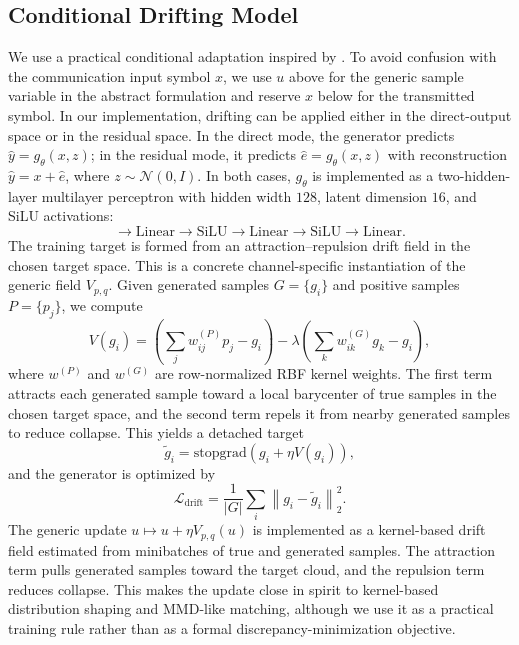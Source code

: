 \documentclass[conference]{IEEEtran}
\begin{document}
\subsection{Conditional Drifting Model}
  We use a practical conditional adaptation inspired by \cite{drifting}.
  To avoid confusion with the communication input symbol \(x\), we use \(u\) above for the generic
  sample variable in the abstract formulation and reserve \(x\) below for the transmitted symbol.
  In our implementation, drifting can be applied either in the direct-output space or in the residual space.
  In the direct mode, the generator predicts \(\hat y = g_\theta(x,z)\); in the residual mode, it predicts
  \(\hat e = g_\theta(x,z)\) with reconstruction \(\hat y = x + \hat e\), where \(z \sim \mathcal{N}(0, I).\)
  In both cases, \(g_\theta\) is implemented as a two-hidden-layer multilayer perceptron with hidden
  width \(128\), latent dimension \(16\), and SiLU activations:
\begin{equation}
[x, z]
\rightarrow
\mathrm{Linear}
\rightarrow
\mathrm{SiLU}
\rightarrow
\mathrm{Linear}
\rightarrow
\mathrm{SiLU}
\rightarrow
\mathrm{Linear}.
\end{equation}
The training target is formed from an attraction--repulsion drift field in the chosen target space. This is a concrete channel-specific instantiation of the generic field \(V_{p,q}\).
Given generated samples \(G = \{g_i\}\) and positive samples \(P = \{p_j\}\), we compute
\begin{equation}
V(g_i)
=
\left(
\sum_j w^{(P)}_{ij} p_j - g_i
\right)
-
\lambda
\left(
\sum_k w^{(G)}_{ik} g_k - g_i
\right),
\end{equation}
where \(w^{(P)}\) and \(w^{(G)}\) are row-normalized RBF kernel weights.
The first term attracts each generated sample toward a local barycenter of true samples in the chosen target space, and the second term repels it from nearby generated samples to reduce collapse.
This yields a detached target
\begin{equation}
\tilde{g}_i
=
\mathrm{stopgrad}\!\left(g_i + \eta V(g_i)\right),
\end{equation}
and the generator is optimized by
\begin{equation}
\mathcal{L}_{\text{drift}}
=
\frac{1}{|G|}
\sum_i
\left\|
g_i - \tilde{g}_i
\right\|_2^2.
\end{equation}
The generic update \(u \mapsto u + \eta V_{p,q}(u)\) is implemented as a kernel-based drift field estimated from minibatches of true and generated samples. The attraction term pulls generated samples toward the target cloud, and the repulsion term reduces collapse. This makes the update close in spirit to kernel-based distribution shaping and MMD-like matching, although we use it as a practical training rule rather than as a formal discrepancy-minimization objective.
\end{document}
